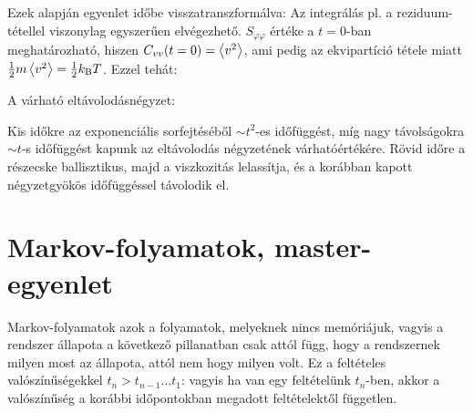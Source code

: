   Ezek alapján  egyenlet időbe visszatranszformálva:
  Az integrálás pl. a reziduum-tétellel viszonylag egyszerűen elvégezhető. $S_{\varphi\varphi}$ értéke a $t=0$-ban meghatározható, hiszen $C_{vv}(t=0)=\left\langle v^2\right\rangle$, ami pedig az ekvipartíció tétele miatt $\frac{1}{2}m\left\langle v^2\right\rangle=\frac{1}{2}k_\text{B} T$. Ezzel tehát:
  
  A várható eltávolodásnégyzet:
  
  Kis időkre az exponenciális sorfejtéséből $\sim t^2$-es időfüggést, míg nagy távolságokra $\sim t$-s időfüggést kapunk az eltávolodás négyzetének várhatóértékére. Rövid időre a részecske ballisztikus, majd a viszkozitás lelassítja, és a korábban kapott négyzetgyökös időfüggéssel távolodik el. 
  
  \section{Markov-folyamatok, master-egyenlet}
   
   Markov-folyamatok azok a folyamatok, melyeknek nincs memóriájuk, vagyis a rendszer állapota a következő pillanatban csak attól függ, hogy a rendszernek milyen most az állapota, attól nem hogy milyen volt. Ez a feltételes valószínűségekkel $t_n>t_{n-1}\dots t_1$:
   vagyis ha van egy feltételünk $t_n$-ben, akkor a valószínűség a korábbi időpontokban megadott feltételektől független.
   

